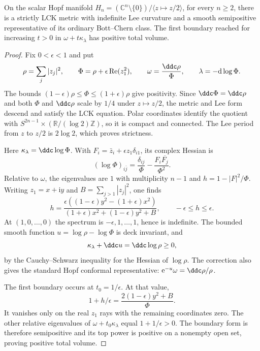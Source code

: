 \begin{example}\label{lck:indefinite-hopf-lee}
On the scalar Hopf manifold
$H_n=(\mathbb C^n\setminus\{0\})/\langle z\mapsto z/2\rangle$,
for every $n\geq2$, there is a strictly LCK metric with
indefinite Lee curvature and a smooth semipositive representative
of its ordinary Bott--Chern class. The first boundary reached
for increasing $t>0$ in $\omega+t\kappa_\lambda$ has positive
total volume.
\end{example}
\begin{proof}
Fix $0<\epsilon<1$ and put
\[
 \rho=\sum_j|z_j|^2,\qquad
 \Phi=\rho+\epsilon\operatorname{Re}(z_1^2),\qquad
 \omega=\frac{\ddc\rho}{\Phi},\qquad
 \lambda=-\mathrm d\log\Phi.
\]
The bounds $(1-\epsilon)\rho\leq\Phi\leq(1+\epsilon)\rho$
give positivity. Since $\ddc\Phi=\ddc\rho$ and both $\Phi$
and $\ddc\rho$ scale by $1/4$ under $z\mapsto z/2$,
the metric and Lee form descend and satisfy the LCK equation.
Polar coordinates identify the quotient with
$S^{2n-1}\times(\mathbb R/(\log2)\mathbb Z)$, so it is compact
and connected. The Lee period from $z$ to $z/2$ is $2\log2$,
which proves strictness.

Here $\kappa_\lambda=\ddc\log\Phi$. With
$F_i=\bar z_i+\epsilon z_1\delta_{i1}$, its complex Hessian is
\[
 (\log\Phi)_{i\bar j}
 =\frac{\delta_{ij}}{\Phi}
       -\frac{F_i\overline{F_j}}{\Phi^2}.
\]
Relative to $\omega$, the eigenvalues are $1$ with multiplicity
$n-1$ and $h=1-|F|^2/\Phi$. Writing $z_1=x+\mathrm i y$ and
$B=\sum_{j>1}|z_j|^2$, one finds
\[
 h=\frac{\epsilon((1-\epsilon)y^2-(1+\epsilon)x^2)}
           {(1+\epsilon)x^2+(1-\epsilon)y^2+B},
 \qquad -\epsilon\leq h\leq\epsilon.
\]
At $(1,0,\ldots,0)$ the spectrum is
$-\epsilon,1,\ldots,1$, hence is indefinite. The bounded smooth
function $u=\log\rho-\log\Phi$ is deck invariant, and
\[
 \kappa_\lambda+\ddc u=\ddc\log\rho\geq0,
\]
by the Cauchy--Schwarz inequality for the Hessian of $\log\rho$.
The correction also gives the standard Hopf conformal representative:
$\mathrm e^{-u}\omega=\ddc\rho/\rho$.

The first boundary occurs at $t_0=1/\epsilon$. At that value,
\[
 1+h/\epsilon=\frac{2(1-\epsilon)y^2+B}{\Phi}.
\]
It vanishes only on the real $z_1$ rays with the remaining
coordinates zero. The other relative eigenvalues of
$\omega+t_0\kappa_\lambda$ equal $1+1/\epsilon>0$.
The boundary form is therefore semipositive and its top power
is positive on a nonempty open set, proving positive total volume.
\end{proof}

